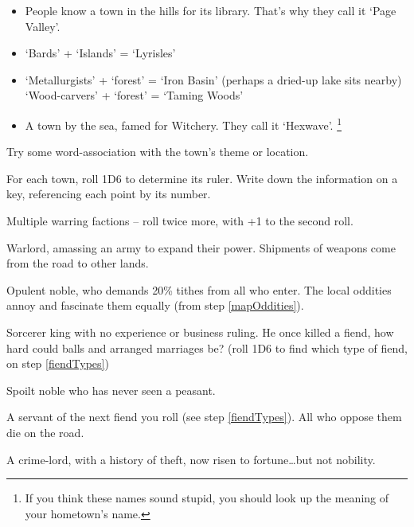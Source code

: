 \begin{multicols}{2}
\begin{itemize}
  \item
  People know a town in the hills for its library. That's why they call
  it `Page Valley'.
  \item
  `Bards' + `Islands' = `Lyrisles'
  \item
  \ifodd\value{r4}
    `Metallurgists' + `forest' = `Iron Basin' (perhaps a dried-up lake sits nearby)
  \else
    `Wood-carvers' + `forest' = `Taming Woods'
  \fi
  \item
  A town by the sea, famed for Witchery.
  They call it `Hexwave'.%
  \footnote{If you think these names sound stupid, you should look up the meaning of your hometown's name.}
\end{itemize}

Try some word-association with the town's theme or location.


For each town, roll 1D6 to determine its ruler.
Write down the information on a key, referencing each point by its number.

\begin{dlist}
  \item
  Multiple warring factions -- roll twice more, with +1 to the second roll.
  \item
  Warlord, amassing an army to expand their power.
  Shipments of weapons come from the road to other lands.
  \item
  Opulent noble, who demands 20\% tithes from all who enter.
  The local oddities annoy and fascinate them equally (from step \ref{mapOddities}).
  \item
  Sorcerer king with no experience or business ruling.
  He once killed a fiend, how hard could balls and arranged marriages be?
  (roll 1D6 to find which type of fiend, on step \ref{fiendTypes})
  \item
  Spoilt noble who has never seen a peasant.
  \item
  A servant of the next fiend you roll (see step \ref{fiendTypes}).
  All who oppose them die on the road.
  \item
  A crime-lord, with a history of theft, now risen to fortune\ldots but not nobility.

\end{dlist}



\end{multicols}
